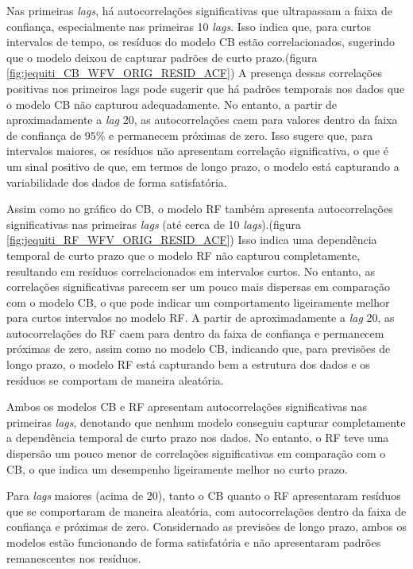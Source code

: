 Nas primeiras \textit{lags}, há autocorrelações significativas que ultrapassam a faixa de confiança, especialmente nas primeiras 10 \textit{lags}. Isso indica que, para curtos intervalos de tempo, os resíduos do modelo CB estão correlacionados, sugerindo que o modelo deixou de capturar padrões de curto prazo.(figura \ref{fig:jequiti_CB_WFV_ORIG_RESID_ACF}) A presença dessas correlações positivas nos primeiros lags pode sugerir que há padrões temporais nos dados que o modelo CB não capturou adequadamente. No entanto, a partir de aproximadamente a \textit{lag} 20, as autocorrelações caem para valores dentro da faixa de confiança de $95\%$ e permanecem próximas de zero. Isso sugere que, para intervalos maiores, os resíduos não apresentam correlação significativa, o que é um sinal positivo de que, em termos de longo prazo, o modelo está capturando a variabilidade dos dados de forma satisfatória.

Assim como no gráfico do CB, o modelo RF também apresenta autocorrelações significativas nas primeiras \textit{lags} (até cerca de 10 \textit{lags}).(figura \ref{fig:jequiti_RF_WFV_ORIG_RESID_ACF}) Isso indica uma dependência temporal de curto prazo que o modelo RF não capturou completamente, resultando em resíduos correlacionados em intervalos curtos. No entanto, as correlações significativas parecem ser um pouco mais dispersas em comparação com o modelo CB, o que pode indicar um comportamento ligeiramente melhor para curtos intervalos no modelo RF. A partir de aproximadamente a \textit{lag} 20, as autocorrelações do RF caem para dentro da faixa de confiança e permanecem próximas de zero, assim como no modelo CB, indicando que, para previsões de longo prazo, o modelo RF está capturando bem a estrutura dos dados e os resíduos se comportam de maneira aleatória.

Ambos os modelos CB e RF apresentam autocorrelações significativas nas primeiras \textit{lags}, denotando que nenhum modelo conseguiu capturar completamente a dependência temporal de curto prazo nos dados. No entanto, o RF teve uma dispersão um pouco menor de correlações significativas em comparação com o CB, o que indica um desempenho ligeiramente melhor no curto prazo.

Para \textit{lags} maiores (acima de 20), tanto o CB quanto o RF apresentaram resíduos que se comportaram de maneira aleatória, com autocorrelações dentro da faixa de confiança e próximas de zero. Considernado as previsões de longo prazo, ambos os modelos estão funcionando de forma satisfatória e não apresentaram padrões remanescentes nos resíduos.

